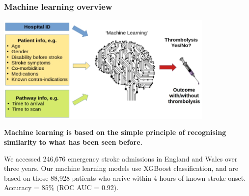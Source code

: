 \begin{frame}
\frametitle{Machine learning overview}
\begin{center}
\includegraphics[width=0.80\textwidth]{./images/ml_model_high_level.jpg}
\end{center}

\small
\textbf{Machine learning is based on the simple principle of recognising similarity to what has been seen before.}
\vspace{2mm}

\footnotesize{We accessed 246,676 emergency stroke admissions in England and Wales over three years. Our machine learning models use XGBoost classification, and are based on those 88,928 patients who arrive within 4 hours of known stroke onset. Accuracy = 85\% (ROC AUC = 0.92).}
\end{frame}